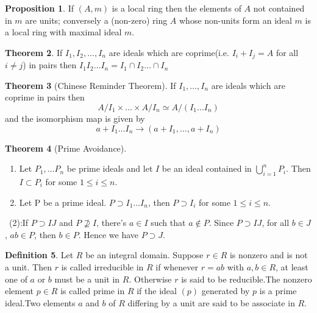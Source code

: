 \documentclass[a4paper,12pt]{article}
\newenvironment{prooff}{{\noindent\it\textcolor{cyan!40!black}{Proof}:}\,}{\par}
\theoremstyle{definition}
\newtheorem{defn}{Definition}[subsection]
\newtheorem{theo}[defn]{Theorem}
\newtheorem{prop}[defn]{Proposition}
\begin{document}
\begin{prop}
    If $(A,m)$ is a local ring then the elements of $A$ not contained in $m$ are units; conversely a
    (non-zero) ring $A$ whose non-units form an ideal $m$ is a local ring with maximal ideal $m$.
    \label{Proposition:unit=A-m}
\end{prop}
\begin{theo}
    If $I_1,I_2,...,I_n$ are ideals which are coprime(i.e. $I_i+I_j=A$ for all $i\neq j$) in pairs then
    $I_1 I_2\dots I_n=I_1\cap I_2\dots \cap I_n$
\end{theo}
\begin{theo}[Chinese Reminder Theorem]
    If $I_1,\dots, I_n$ are ideals which are coprime in pairs then
    \begin{equation*}
        A/I_1\times \dots \times A/I_n\simeq A/(I_1\dots I_n)
    \end{equation*}
    and the isomorphism map is given by
    \begin{equation*}
        a+I_1\dots I_n\rightarrow (a+I_1,\dots,a+I_n)
    \end{equation*}
\end{theo}
\begin{theo}[Prime Avoidance]
    \par
    \begin{enumerate}[(1)]
        \item Let $P_1,\dots P_n$ be prime ideals and let $I$ be an ideal
              contained in $\bigcup_{i=1}^n P_i$. Then $I\subset P_i$ for some $1 \le i \le n$.
        \item Let P be a prime ideal. $P\supset I_1\dots I_n$, then $P\supset I_i$ for some $1\le i \le n$.
    \end{enumerate}
    \label{theorem:prime avoidance}
\end{theo}
\begin{prooff}
    (2):If $P\supset IJ$ and $P\nsupseteq I$, there's $a\in I$ such that $a\notin P$. Since $P\supset IJ$, for all $b\in J$, $ab\in P$, then $b\in P$. Hence we have $P\supset J $.
\end{prooff}
\begin{defn}
    Let $R$ be an integral domain.
    Suppose $r\in R$ is nonzero and is not a unit. Then $r$ is called irreducible in $R$
    if whenever $r = ab$ with $a, b\in R$, at least one of $a$ or $b$ must be a unit in $R$.
    Otherwise $r$ is said to be reducible.The nonzero element $p\in R$ is called prime in $R$ if the ideal $(p)$ generated by
    $p$ is a prime ideal.Two elements $a$ and $b$ of $R$ differing by a unit are said to be associate in $R$.
\end{defn}
\end{document}
